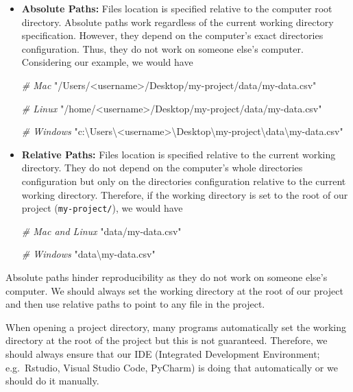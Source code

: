 \documentclass[
  11pt,
]{book}
\newenvironment{Shaded}{\begin{snugshade}}{\end{snugshade}}
\newcommand{\CommentTok}[1]{\textcolor[rgb]{0.56,0.35,0.01}{\textit{#1}}}
\newcommand{\StringTok}[1]{\textcolor[rgb]{0.31,0.60,0.02}{#1}}
\begin{document}
\begin{itemize}
\item
  \textbf{Absolute Paths:} Files location is specified relative to the computer root directory. Absolute paths work regardless of the current working directory specification. However, they depend on the computer's exact directories configuration. Thus, they do not work on someone else's computer. Considering our example, we would have

\begin{Shaded}
\begin{Highlighting}[]
\CommentTok{\# Mac}
\StringTok{"/Users/\textless{}username\textgreater{}/Desktop/my{-}project/data/my{-}data.csv"}

\CommentTok{\# Linux}
\StringTok{"/home/\textless{}username\textgreater{}/Desktop/my{-}project/data/my{-}data.csv"}

\CommentTok{\# Windows}
\StringTok{"c:\textbackslash{}Users\textbackslash{}\textless{}username\textgreater{}\textbackslash{}Desktop\textbackslash{}my{-}project\textbackslash{}data\textbackslash{}my{-}data.csv"}
\end{Highlighting}
\end{Shaded}
\item
  \textbf{Relative Paths:} Files location is specified relative to the current working directory. They do not depend on the computer's whole directories configuration but only on the directories configuration relative to the current working directory. Therefore, if the working directory is set to the root of our project (\texttt{my-project/}), we would have

\begin{Shaded}
\begin{Highlighting}[]
\CommentTok{\# Mac and Linux}
\StringTok{"data/my{-}data.csv"}

\CommentTok{\# Windows}
\StringTok{"data\textbackslash{}my{-}data.csv"}
\end{Highlighting}
\end{Shaded}
\end{itemize}

Absolute paths hinder reproducibility as they do not work on someone else's computer. We should always set the working directory at the root of our project and then use relative paths to point to any file in the project.

When opening a project directory, many programs automatically set the working directory at the root of the project but this is not guaranteed. Therefore, we should always ensure that our IDE (Integrated Development Environment; e.g.~Rstudio, Visual Studio Code, PyCharm) is doing that automatically or we should do it manually.
\end{document}

